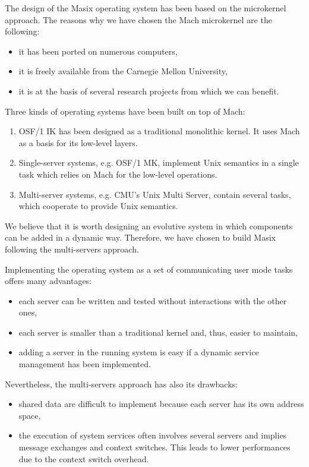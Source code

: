 	The design of the Masix operating system\cite {card:these} has been
based on the microkernel approach. The reasons why we have chosen the
Mach microkernel are the following:
\begin {itemize}
\item it has been ported on numerous computers,
\item it is freely available from the Carnegie Mellon University,
\item it is at the basis of several research projects from which we can
benefit.
\end {itemize}

	Three kinds of operating systems have been built on top of Mach:
\begin {enumerate}
\item OSF/1 IK\cite {osf1} has been designed as a traditional monolithic
kernel. It uses Mach as a basis for its low-level layers.
\item Single-server systems, e.g. OSF/1 MK\cite {osf1mk}, implement Unix
semantics in a single task which relies on Mach for the low-level operations.
\item Multi-server systems, e.g. CMU's Unix Multi
Server\cite {mach:multiserv1}, contain several tasks, which cooperate to
provide Unix semantics.
\end {enumerate}

	We believe that it is worth designing an evolutive system in which
components can
be added in a dynamic way. Therefore, we have chosen to build Masix following
the multi-servers approach.

	Implementing the operating
system as a set of communicating user mode tasks offers many advantages:
\begin {itemize}
\item each server can be written and tested without interactions with the
other ones,
\item each server is smaller than a traditional kernel and, thus, easier
to maintain,
\item adding a server in the running system is easy if a dynamic service
management has been implemented.
\end {itemize}

	Nevertheless, the multi-servers approach has also its drawbacks:
\begin {itemize}
\item shared data are difficult to implement because each server has its
own address space,
\item the execution of system services often involves several servers and
implies message exchanges and context switches. This leads to lower
performances due to the context switch overhead.
\end {itemize}

